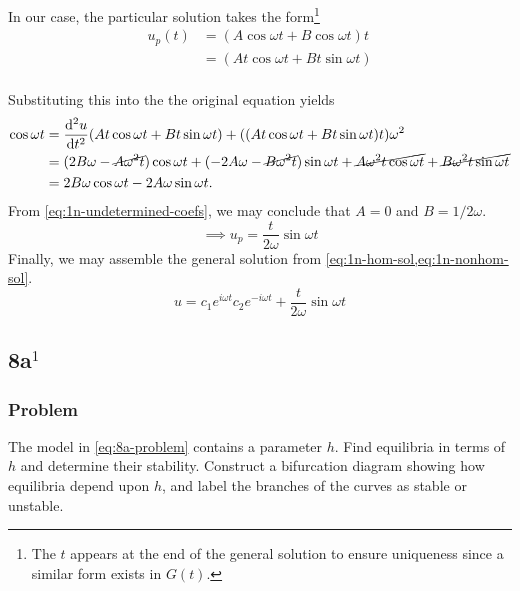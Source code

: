 \documentclass[12pt]{article}
\begin{document}
\begin{enumerate}
  In our case, the particular solution takes the form\footnote{The $t$ appears
    at the end of the general solution to ensure uniqueness since a similar form
    exists in $G(t)$.}
  \begin{equation*}
    \begin{aligned}
      u_p(t) &= (A\cos \omega t + B\cos \omega t)t \\
      &= (At\cos \omega t + Bt\sin \omega t) \\
    \end{aligned}
  \end{equation*}

  Substituting this into the the original equation yields
  \begin{equation}
    \label{eq:1n-undetermined-coefs}
    \begin{aligned}
      \cos \omega t &=
      \od[2]{u}{t}(At\cos \omega t + Bt\sin \omega t)
      + ((At\cos \omega t + Bt\sin \omega t)t)\omega^2 \\
      &= (2B\omega - \cancel{A\omega^2t})\cos\omega t
      + (-2A\omega - \cancel{B\omega^2t})\sin\omega t
      + \cancel{A\omega^2t\cos\omega t} + \cancel{B\omega^2t\sin\omega t} \\
      &= 2B\omega\cos\omega t - 2A\omega\sin\omega t.
    \end{aligned}
  \end{equation}
  From \cref{eq:1n-undetermined-coefs}, we may conclude that $A=0$ and
  $B=1/2\omega$.
  \begin{equation}
    \label{eq:1n-nonhom-sol}
    \implies u_p = \frac{t}{2\omega}\sin\omega t
  \end{equation}
  Finally, we may assemble the general solution from
  \cref{eq:1n-hom-sol,eq:1n-nonhom-sol}.
  \begin{equation*}
    \boxed{
      u = c_1e^{i\omega t}c_2e^{-i\omega t} + \frac{t}{2\omega}\sin\omega t
    }
  \end{equation*}
\end{enumerate}

\subsection{8a$^1$}
\subsubsection*{Problem}
The model in \cref{eq:8a-problem} contains a parameter $h$. Find equilibria in
terms of $h$ and determine their stability. Construct a bifurcation diagram
showing how equilibria depend upon $h$, and label the branches of the curves as
stable or unstable.
\end{document}
